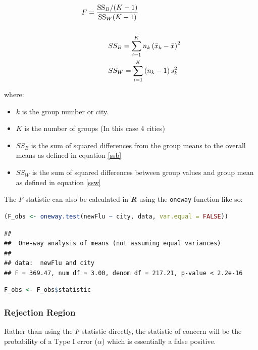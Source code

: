 \documentclass{article}
\newcommand{\passthrough}[1]{#1}
\providecommand{\tightlist}{%
  \setlength{\itemsep}{0pt}\setlength{\parskip}{0pt}}
\begin{document}
\begin{align}
F &= \frac{\mathrm{SS}_B/(K-1)}{\mathrm{SS}_W(K-1)}  \label{F} \\
\ \notag \\
& \quad \qquad S S_{B}=\sum_{i=1}^{K} n_{k}\left(\bar{x}_{k}-\bar{x}\right)^{2} \label{ssb} \\
& \quad \qquad S S_{W}=\sum_{i=1}^{K}\left(n_{k}-1\right) s_{k}^{2} \label{ssw}
\end{align}

where:

\begin{itemize}
\tightlist
\item
  \(k\) is the group number or city.
\item
  \(K\) is the number of groups (In this case 4 cities)
\item
  \(SS_B\) is the sum of squared differences from the group means to the
  overall means as defined in equation \eqref{ssb}
\item
  \(SS_W\) is the sum of squared differences between group values and
  group mean as defined in equation \eqref{ssw}
\end{itemize}

The \(F\) statistic can also be calculated in \textbf{\emph{R}} using
the \passthrough{\lstinline!oneway!} function like so:

\begin{lstlisting}[language=R]
(F_obs <- oneway.test(newFlu ~ city, data, var.equal = FALSE))
\end{lstlisting}

\begin{lstlisting}
## 
##  One-way analysis of means (not assuming equal variances)
## 
## data:  newFlu and city
## F = 369.47, num df = 3.00, denom df = 217.21, p-value < 2.2e-16
\end{lstlisting}

\begin{lstlisting}[language=R]
F_obs <- F_obs$statistic
\end{lstlisting}

\hypertarget{rejection-region}{%
\subsubsection{Rejection Region}\label{rejection-region}}

Rather than using the \(F\) statistic directly, the statistic of concern
will be the probability of a Type I error (\(\alpha\)) which is
essentially a false positive.
\end{document}
